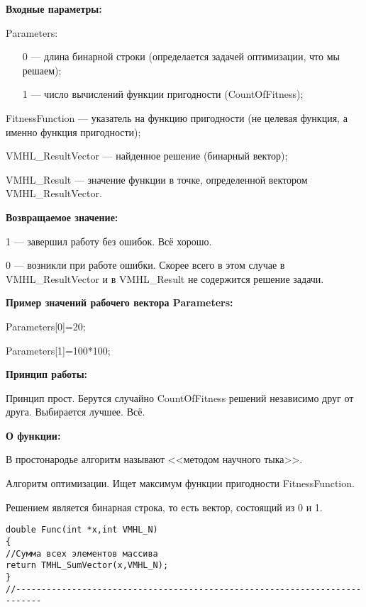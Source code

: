 \textbf{Входные параметры:}

 Parameters:
 
 \begin{itemize}
 \item [0] --- длина бинарной строки (определается задачей оптимизации, что мы решаем);
 \item [1] --- число вычислений функции пригодности (CountOfFitness);
 \end{itemize}
  
 FitnessFunction --- указатель на функцию пригодности (не целевая функция, а именно функция пригодности);
 
 VMHL\_ResultVector --- найденное решение (бинарный вектор);
 
 VMHL\_Result --- значение функции в точке, определенной вектором VMHL\_ResultVector.

\textbf{Возвращаемое значение:}
 
 1 --- завершил работу без ошибок. Всё хорошо.
 
 0 --- возникли при работе ошибки. Скорее всего в этом случае в VMHL\_ResultVector и в VMHL\_Result не содержится решение задачи.
 
\textbf{Пример значений рабочего вектора Parameters:}

 Parameters[0]=20;
 
 Parameters[1]=100*100;
 
 \textbf{Принцип работы:}
 
 Принцип прост. Берутся случайно CountOfFitness решений независимо друг от друга. Выбирается лучшее. Всё.
 
 \textbf{ О функции:}
 
 В простонародье алгоритм называют <<методом научного тыка>>.
 
Алгоритм оптимизации. Ищет максимум функции пригодности FitnessFunction.

Решением является бинарная строка, то есть вектор, состоящий из 0 и 1.

\begin{lstlisting}[caption=Оптимизируемая функция]
double Func(int *x,int VMHL_N)
{
//Сумма всех элементов массива
return TMHL_SumVector(x,VMHL_N);
}
//---------------------------------------------------------------------------
\end{lstlisting}
